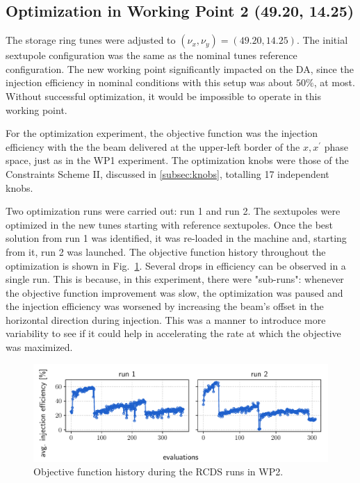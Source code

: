 \subsection{Optimization in Working Point 2 (49.20, 14.25)}
The storage ring tunes were adjusted to $(\nu_x, \nu_y)=(49.20, 14.25)$. The initial sextupole configuration was the same as the nominal tunes reference configuration. The new working point significantly impacted on the DA, since the injection efficiency in nominal conditions with this setup was about $50\%$, at most. Without successful optimization, it would be impossible to operate in this working point.

For the optimization experiment, the objective function was the injection efficiency with the the beam delivered at the upper-left border of the $x,x^\prime$ phase space, just as in the WP1 experiment. The optimization knobs were those of the Constraints Scheme II, discussed in \ref{subsec:knobs}, totalling 17 independent knobs.

Two optimization runs were carried out: run 1 and run 2. The sextupoles were optimized in the new tunes starting with reference sextupoles. Once the best solution from run 1 was identified, it was re-loaded in the machine and, starting from it, run 2 was launched. The objective function history throughout the optimization is shown in Fig.~\ref{fig:wp_2_history}. Several drops in efficiency can be observed in a single run. This is because, in this experiment, there were "sub-runs": whenever the objective function improvement was slow, the optimization was paused and the injection efficiency was worsened by increasing the beam's offset in the horizontal direction during injection. This was a manner to introduce more variability to see if it could help in accelerating the rate at which the objective was maximized.
\begin{figure}[htb]
    \includegraphics[width=\columnwidth]{Images/wp2_objfunc_hist.pdf}
    \caption[Objective function history during the RCDS runs in WP2.]{Objective function history during the RCDS runs in WP2.}
    \label{fig:wp_2_history}
\end{figure}
